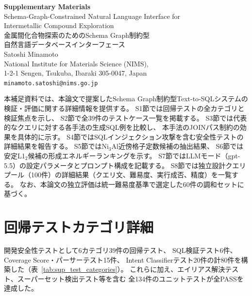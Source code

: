 \documentclass[5p,twocolumn]{elsarticle}
\begin{document}
\begin{center}
  {\LARGE\bfseries Supplementary Materials}\\[0.8em]
  {\large Schema-Graph-Constrained Natural Language Interface for\\
  Intermetallic Compound Exploration}\\[0.5em]
  {\large 金属間化合物探索のためのSchema Graph制約型\\自然言語データベースインターフェース}\\[1.0em]
  {\normalsize Satoshi Minamoto}\\[0.3em]
  {\small National Institute for Materials Science (NIMS),\\
  1-2-1 Sengen, Tsukuba, Ibaraki 305-0047, Japan}\\[0.3em]
  {\small \texttt{minamoto.satoshi@nims.go.jp}}
\end{center}
\vspace{1.0em}
\noindent\hrulefill
\vspace{1.0em}

\noindent
本補足資料では、本論文で提案したSchema Graph制約型Text-to-SQLシステムの
検証・評価に関する詳細情報を提供する。
S1節では回帰テストの全カテゴリと検証焦点を示し、
S2節で全39件のテストケース一覧を掲載する。
S3節では代表的なクエリに対する各手法の生成SQL例を比較し、
本手法のJOINパス制約の効果を具体的に示す。
S4節ではSQLインジェクション攻撃を含む安全性テストの詳細結果を報告する。
S5節ではNi$_3$Al近傍格子定数候補の抽出結果、
S6節では安定L1$_2$候補の形成エネルギーランキングを示す。
S7節ではLLMモード（gpt-5.5）の設定パラメータとプロンプト構成を記載する。
S8節では独立設計クエリプール（100件）の詳細結果（クエリ文、難易度、実行成否、精度）を一覧する。
なお、本論文の独立評価は統一難易度基準で選定した60件の調和セットに基づく。

\section{回帰テストカテゴリ詳細}
\label{sec:sup_test_categories}

開発安全性テストとして6カテゴリ39件の回帰テスト、
SQL検証テスト6件、Coverage Score・パーサーテスト15件、
Intent Classifierテスト20件の計80件を構築した（表~\ref{tab:sup_test_categories}）。
これらに加え、エイリアス解決テスト、スーパーセット検出テスト等を含む
全134件のユニットテストが全PASSを達成した。
\end{document}
